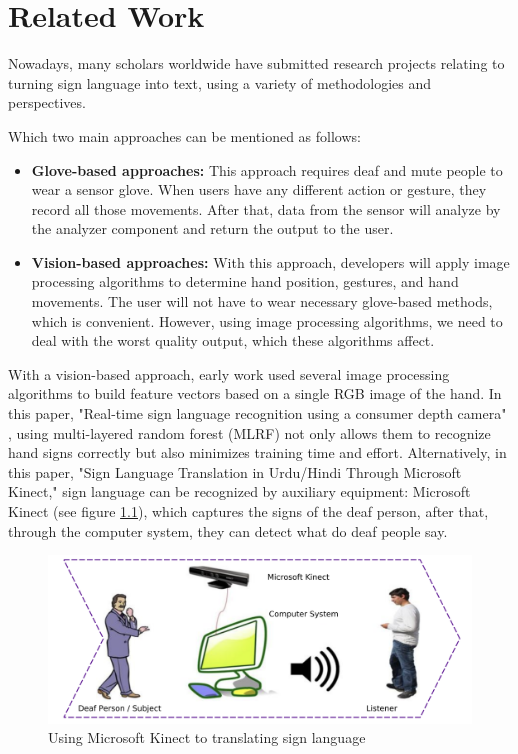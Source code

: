 \chapter{Related Work}

Nowadays, many scholars worldwide have submitted research projects relating to turning sign language into text, using a variety of methodologies and perspectives.

Which two main approaches can be mentioned as follows:
\begin{itemize}
  \item \textbf{Glove-based approaches:} This approach requires deaf and mute people to wear a sensor glove. When users have any different action or gesture, they record all those movements. After that, data from the sensor will analyze by the analyzer component and return the output to the user.
  \item \textbf{Vision-based approaches:} With this approach, developers will apply image processing algorithms to determine hand position, gestures, and hand movements. The user will not have to wear necessary glove-based methods, which is convenient. However, using image processing algorithms, we need to deal with the worst quality output, which these algorithms affect.
\end{itemize}

With a vision-based approach, early work used several image processing algorithms to build feature vectors based on a single RGB image of the hand. In this paper, "Real-time sign language recognition using a consumer depth camera" \cite{kuznetsova2013real}, using multi-layered random forest (MLRF) not only allows them to recognize hand signs correctly but also minimizes training time and effort. Alternatively, in this paper, "Sign Language Translation in Urdu/Hindi Through Microsoft Kinect," sign language can be recognized by auxiliary equipment: Microsoft Kinect (see figure \ref{fig:Chap2-MS-Kinect}), which captures the signs of the deaf person, after that, through the computer system, they can detect what do deaf people say.

\begin{figure}[H]
  \centering
  \includegraphics[width=\textwidth]{img/Chap2/MS-Kinect.png}
  \caption{Using Microsoft Kinect to translating sign language}
  \label{fig:Chap2-MS-Kinect}
\end{figure}

